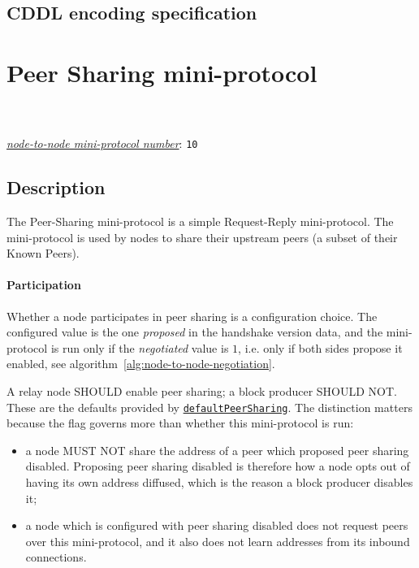 \subsection{CDDL encoding specification}


\section{Peer Sharing mini-protocol}
\\
\\
\hyperref[table:node-to-node-protocol-numbers]{\textit{node-to-node mini-protocol number}}: \texttt{10}\\
\label{peer-sharing-protocol}
\subsection{Description}
The Peer-Sharing mini-protocol is a simple Request-Reply mini-protocol. The mini-protocol is used by nodes to share their upstream peers (a subset of their Known Peers).

\paragraph{Participation}
Whether a node participates in peer sharing is a configuration choice.  The
configured value is the one \emph{proposed} in the handshake version data, and
the mini-protocol is run only if the \emph{negotiated} value is $1$, i.e. only
if both sides propose it enabled, see
algorithm~\ref{alg:node-to-node-negotiation}.

A relay node SHOULD enable peer sharing; a block producer SHOULD NOT.  These
are the defaults provided by
\href{https://ouroboros-network.cardano.intersectmbo.org/ouroboros-network/Ouroboros-Network-Diffusion-Configuration.html\#v:defaultPeerSharing}{\texttt{defaultPeerSharing}}.
The distinction matters because the flag governs more than whether this
mini-protocol is run:
\begin{itemize}
  \item a node MUST NOT share the address of a peer which proposed peer
    sharing disabled.  Proposing peer sharing disabled is therefore how a node
    opts out of having its own address diffused, which is the reason a block
    producer disables it;
  \item a node which is configured with peer sharing disabled does not request
    peers over this mini-protocol, and it also does not learn addresses from
    its inbound connections.
\end{itemize}

